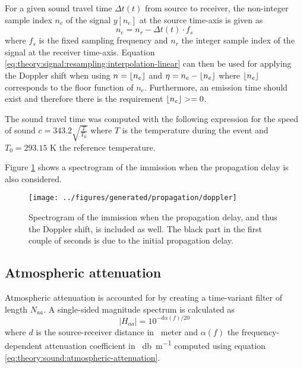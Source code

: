 For a given sound travel time $\Delta t(t)$ from source to receiver, the non-integer sample index
$n_{e}$ of the signal $y[n_e]$ at the source time-axis is given as
\begin{equation}
 n_{e} = n_r - \Delta t (t) \cdot f_s
\end{equation}
where $f_s$ is the fixed sampling frequency and $n_r$ the integer sample index
of the signal at the receiver time-axis. Equation
\eqref{eq:theory:signal:resampling:interpolation-linear} can then be used for
applying the Doppler shift when using $n=\lfloor n_e\rfloor$ and $\eta = n_e - \lfloor n_e\rfloor$
where $\lfloor n_e\rfloor$ corresponds to the floor function of $n_e$.
Furthermore, an emission time should exist and therefore there is the
requirement $\lfloor n_e\rfloor >= 0$.

The sound travel time was computed with the following expression for the speed of sound $c =
343.2 \sqrt{ \frac{T}{T_0} }$ where $T$ is the temperature during the event and
$T_0 = 293.15$ K the reference temperature.

Figure \ref{fig:implementation:propagation:doppler} shows a spectrogram of the
immission when the propagation delay is also considered.

\begin{figure}[H]
  \centering
  \texttt{[image: ../figures/generated/propagation/doppler]}
  \caption{Spectrogram of the immission when the propagation delay, and thus the Doppler shift, is included as well. The black part in the first couple of seconds is due to the initial propagation delay.}
  \label{fig:implementation:propagation:doppler}
\end{figure}

\newpage
\subsection{Atmospheric attenuation} %
Atmospheric attenuation is accounted for by creating a time-variant filter of length $N_{aa}$.
A single-sided magnitude spectrum is calculated as
\begin{equation}
 \left| H_{aa} \right| = 10^{- d \alpha(f) / 20}
\end{equation}
where $d$ is the source-receiver distance in \SI{}{meter} and $\alpha(f)$ the
frequency-dependent attenuation coefficient in \SI{}{\decibel\per\meter} computed using
equation \eqref{eq:theory:sound:atmospheric-attenuation}.

